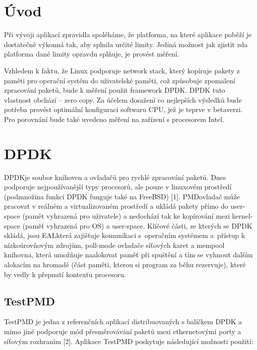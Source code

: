 \documentclass[11pt, titlepage, a4paper]{article}
\begin{document}
		\section{Úvod}

		Při vývoji aplikací zpravidla spoléháme, že platforma, na které aplikace poběží je dostatečně výkonná tak, aby splnila určité limity.
		Jediná možnost jak zjistit zda platforma dané limity opravdu splňuje, je provést měření.

		Vzhledem k faktu, že Linux podporuje network stack, který kopíruje pakety
		z paměti pro operační systém do uživatelské paměti, což způsobuje zpomalení zpracování paketů, bude k měření použit framework DPDK.
		DPDK tuto vlastnost obchází -- zero copy.
		Za účelem dosažení co nejlepších výsledků bude potřeba provést optimální konfiguraci softwaru CPU, jež je teprve v betaverzi.
		Pro porovnání bude také uvedeno měření na zařízení s procesorem Intel.

		\newpage
		\section{DPDK}

		DPDK\footnotemark[1] je soubor knihoven a ovladačů pro rychlé zpracování paketů.
		Dnes podporuje nejpoužívanější typy procesorů, ale pouze v linuxovém prostředí (podmnožina funkcí DPDK funguje také na FreeBSD) [1]. PMD\footnotemark[2] ovladač
		může pracovat v reálném a virtualizovaném prostředí a ukládá pakety přímo do user-space (pamět vyhrazená pro uživatele) a nedochází tak ke kopírování mezi
		kernel-space (paměť vyhrazená pro OS) a user-space.
		\newline
		\newline
		Klíčové části, ze kterých se DPDK skládá, jsou EAL\footnotemark[3] která zajišťuje komunikaci s~operačním systémem a~přístup k nízkoúrovňovým zdrojům,
		poll-mode ovladače síťových karet a mempool knihovna, která umožňuje naalokovat paměť při spuštění a tím se vyhnout dalším alokacím na hromadě
		(část paměti, kterou si program za běhu rezervuje), které by vedly k přepnutí kontextu procesoru.

		\subsection{TestPMD}

		TestPMD je jedna z referenčních aplikací distribuovaných s balíčkem DPDK a mimo jiné podporuje mód přesměrovávání paketů mezi ethernetovými porty a
		síťovým rozhraním [2].
		\newline
		\newline
		Aplikace TestPMD poskytuje následující možnosti použití:
\end{document}
